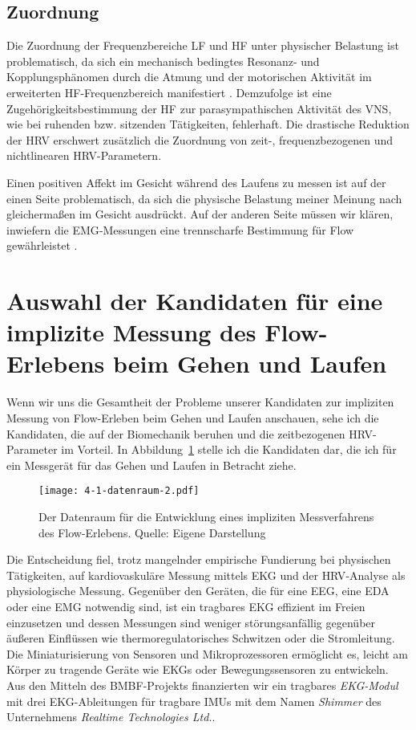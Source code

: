 \subsection{Zuordnung}
\label{sub:zuordnung}
Die Zuordnung der Frequenzbereiche \ac{LF} und \ac{HF} unter physischer Belastung ist problematisch, da sich ein mechanisch bedingtes Resonanz- und Kopplungsphänomen durch die Atmung und der motorischen Aktivität im erweiterten \ac{HF}-Frequenzbereich manifestiert \citep[vgl.][S.~62]{Hoos2010}. Demzufolge ist eine Zugehörigkeitsbestimmung der \ac{HF} zur parasympathischen Aktivität des \ac{VNS}, wie bei ruhenden bzw. sitzenden Tätigkeiten, fehlerhaft. Die drastische Reduktion der \ac{HRV} erschwert zusätzlich die Zuordnung von zeit-, frequenzbezogenen und nichtlinearen \ac{HRV}-Parametern.

Einen positiven Affekt im Gesicht während des Laufens zu messen ist auf der einen Seite problematisch, da sich die physische Belastung meiner Meinung nach gleichermaßen im Gesicht ausdrückt. Auf der anderen Seite müssen wir klären, inwiefern die \ac{EMG}-Messungen eine trennscharfe Bestimmung für Flow gewährleistet \citep[vgl.][]{Peifer2012}.

\section{Auswahl der Kandidaten für eine implizite Messung des Flow-Erlebens beim Gehen und Laufen}
\label{sec:auswahl-der-kandidaten}
Wenn wir uns die Gesamtheit der Probleme unserer Kandidaten zur impliziten Messung von Flow-Erleben beim Gehen und Laufen anschauen, sehe ich die Kandidaten, die auf der Biomechanik beruhen und die zeitbezogenen \ac{HRV}-Parameter im Vorteil. In Abbildung~\ref{fig:4-1-datenraum} stelle ich die Kandidaten dar, die ich für ein Messgerät für das Gehen und Laufen in Betracht ziehe.

\begin{figure}[t]
	\centering
		\texttt{[image: 4-1-datenraum-2.pdf]}
	\caption[Der Datenraum für die Entwicklung eines impliziten Messverfahrens des Flow-Erlebens]{Der Datenraum für die Entwicklung eines impliziten Messverfahrens des Flow-Erlebens. Quelle: Eigene Darstellung}
	\label{fig:4-1-datenraum}
\end{figure}

Die Entscheidung fiel, trotz mangelnder empirische Fundierung bei physischen Tätigkeiten, auf kardiovaskuläre Messung mittels \ac{EKG} und der \ac{HRV}-Analyse als physiologische Messung. Gegenüber den Geräten, die für eine \ac{EEG}, eine \ac{EDA} oder eine \ac{EMG} notwendig sind, ist ein tragbares \ac{EKG} effizient im Freien einzusetzen und dessen Messungen sind weniger störungsanfällig gegenüber äußeren Einflüssen wie thermoregulatorisches Schwitzen oder die Stromleitung. Die Miniaturisierung von Sensoren und Mikroprozessoren ermöglicht es, leicht am Körper zu tragende Geräte wie \acp{EKG} oder Bewegungssensoren zu entwickeln. Aus den Mitteln des \acs{BMBF}-Projekts finanzierten wir ein tragbares \emph{EKG-Modul} mit drei \ac{EKG}-Ableitungen für tragbare \acp{IMU} mit dem Namen \emph{Shimmer} des Unternehmens \emph{Realtime Technologies Ltd.}.

